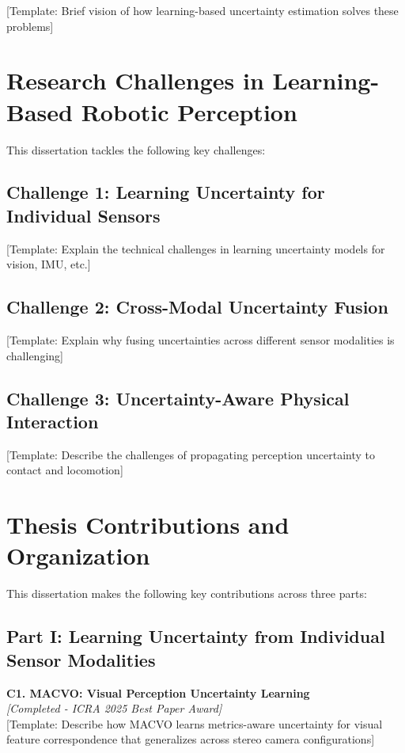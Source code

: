 [Template: Brief vision of how learning-based uncertainty estimation solves these problems]

\section{Research Challenges in Learning-Based Robotic Perception}
\label{sec:challenges}

This dissertation tackles the following key challenges:

\subsection{Challenge 1: Learning Uncertainty for Individual Sensors}
[Template: Explain the technical challenges in learning uncertainty models for vision, IMU, etc.]

\subsection{Challenge 2: Cross-Modal Uncertainty Fusion}
[Template: Explain why fusing uncertainties across different sensor modalities is challenging]

\subsection{Challenge 3: Uncertainty-Aware Physical Interaction}
[Template: Describe the challenges of propagating perception uncertainty to contact and locomotion]

\section{Thesis Contributions and Organization}
\label{sec:contributions}

This dissertation makes the following key contributions across three parts:

\subsection{Part I: Learning Uncertainty from Individual Sensor Modalities}

\textbf{C1. MACVO: Visual Perception Uncertainty Learning} \\
\textit{[Completed - ICRA 2025 Best Paper Award]} \\
[Template: Describe how MACVO learns metrics-aware uncertainty for visual feature correspondence that generalizes across stereo camera configurations]

